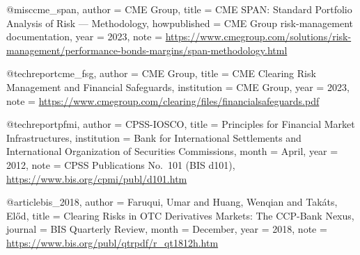 

@misc{cme_span,
  author       = {{CME Group}},
  title        = {{CME SPAN}: Standard Portfolio Analysis of Risk --- Methodology},
  howpublished = {CME Group risk-management documentation},
  year         = {2023},
  note         = {\url{https://www.cmegroup.com/solutions/risk-management/performance-bonds-margins/span-methodology.html}}
}


@techreport{cme_fsg,
  author      = {{CME Group}},
  title       = {{CME} Clearing Risk Management and Financial Safeguards},
  institution = {CME Group}, year = {2023},
  note        = {\url{https://www.cmegroup.com/clearing/files/financialsafeguards.pdf}}
}


@techreport{pfmi,
  author      = {{CPSS-IOSCO}},
  title       = {Principles for Financial Market Infrastructures},
  institution = {Bank for International Settlements and International Organization of Securities Commissions},
  month       = {April}, year = {2012},
  note         = {CPSS Publications No.~101 (BIS d101), \url{https://www.bis.org/cpmi/publ/d101.htm}}
}


@article{bis_2018,
  author  = {Faruqui, Umar and Huang, Wenqian and Tak{\'a}ts, El{\H{o}}d},
  title   = {Clearing Risks in {OTC} Derivatives Markets: The {CCP}-Bank Nexus},
  journal = {BIS Quarterly Review},
  month   = {December}, year = {2018},
  note    = {\url{https://www.bis.org/publ/qtrpdf/r_qt1812h.htm}}
}


